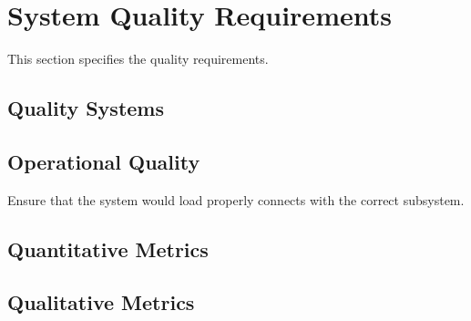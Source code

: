 \KNEADSECTIONNEWPAGE
\section{System Quality Requirements}
\label{lab:sec_Quality}
% 


This section specifies the \ThisSys quality requirements.

\subsection{Quality Systems}
\label{lab:ssec_QualitySystems}



\subsection{Operational Quality}
\label{lab:ssec_OperationalQuality}

Ensure that the system would load properly connects with the correct subsystem.

\subsection{Quantitative Metrics}
\label{lab:ssec_QuantitativeMetrics}





\subsection{Qualitative Metrics}
\label{lab:ssec_QualitativeMetrics}



